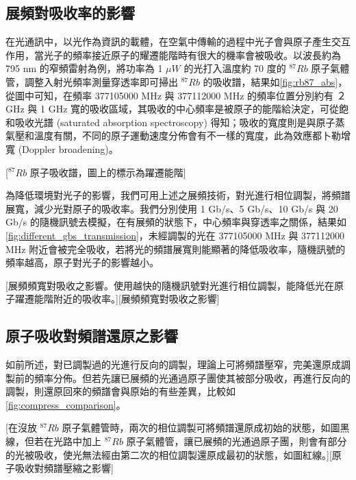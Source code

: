 \documentclass[class=NCU_thesis, crop=false]{standalone}
\begin{document}
\subsection{展頻對吸收率的影響}
\label{section:simulation_absorption}
在光通訊中，以光作為資訊的載體，在空氣中傳輸的過程中光子會與原子產生交互作用，當光子的頻率接近原子的耀遷能階時有很大的機率會被吸收。以波長約為 795 nm 的窄頻雷射為例，將功率為 1 $\mu W$ 的光打入溫度約 70 度的 $^{87}Rb$ 原子氣體管，調整入射光頻率測量穿透率即可掃出 $^{87}Rb$ 的吸收譜，結果如\cref{fig:rb87_abs}，從圖中可知，在頻率 377105000 MHz 與 377112000 MHz 的頻率位置分別約有 ２GHz 與 1 GHz 寬的吸收區域，其吸收的中心頻率是被原子的能階給決定，可從飽和吸收光譜 (saturated absorption spectroscopy) 得知；吸收的寬度則是與原子蒸氣壓和溫度有關，不同的原子運動速度分佈會有不一樣的寬度，此為效應都卜勒增寬 (Doppler broadening)。

[$^{87}Rb$ 原子吸收譜，圖上的標示為躍遷能階]

為降低環境對光子的影響，我們可用上述之展頻技術，對光進行相位調製，將頻譜展寬，減少光對原子的吸收率。我們分別使用 1 Gb/s、5 Gb/s、10 Gb/s 與 20 Gb/s 的隨機訊號去模擬，在有展頻的狀態下，中心頻率與穿透率之關係，結果如\cref{fig:different_gbs_transmission}，未經調製的光在 377105000 MHz 與 377112000 MHz 附近會被完全吸收，若將光的頻譜展寬則能顯著的降低吸收率，隨機訊號的頻率越高，原子對光子的影響越小。

[展頻頻寬對吸收之影響。使用越快的隨機訊號對光進行相位調製，能降低光在原子躍遷能階附近的吸收率。][展頻頻寬對吸收之影響]

\subsection{原子吸收對頻譜還原之影響}
如前所述，對已調製過的光進行反向的調製，理論上可將頻譜壓窄，完美還原成調製前的頻率分佈。但若先讓已展頻的光通過原子團使其被部分吸收，再進行反向的調製，則還原回來的頻譜會與原始的有些差異，比較如\cref{fig:compress_comparison}。

[在沒放 $^{87}Rb$ 原子氣體管時，兩次的相位調製可將頻譜還原成初始的狀態，如圖黑線，但若在光路中加上 $^{87}Rb$ 原子氣體管，讓已展頻的光通過原子團，則會有部分的光被吸收，使光無法經由第二次的相位調製還原成最初的狀態，如圖紅線。][原子吸收對頻譜壓縮之影響]
\end{document}
